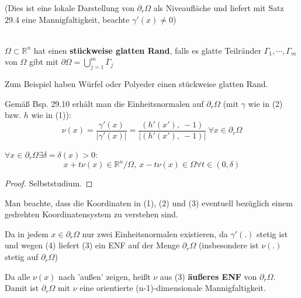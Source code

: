 (Dies ist eine lokale Darstellung von $\partial_r \Omega $ als Niveaufläche
und liefert mit Satz 29.4 eine Mannigfaltigkeit, beachte $\gamma'(x) \neq 0 $)

\begin{definition}
    \mbox{} \\
    $\Omega \subset \mathbb{R}^n $ hat einen \textbf{stückweise glatten Rand}, 
    falls es glatte Teilränder $\Gamma_1, \cdots, \Gamma_m $ von $\Omega$ gibt mit
    $\partial \Omega = \bigcup\limits_{j=1}^m \overline{\Gamma}_j $
\end{definition}

Zum Beispiel haben Würfel oder Polyeder einen stückweise glatten Rand.

Gemäß Bsp. 29.10 erhält man die Einheitsnormalen auf $\partial_r \Omega $
(mit $\gamma$ wie in (2) bzw. $h$ wie in (1)): \\

\begin{equation}
    \nu(x) = 
    \frac{\gamma'(x)}{|\gamma'(x)|} = 
    \frac{(h'(x'),\ -1)}{|(h'(x'),\ -1)|} \
    \forall x \in \partial_r \Omega
\end{equation}

\begin{lemma}
$\forall x \in \partial_r \Omega \exists \delta = \delta(x) > 0$:
\begin{equation}
    x + t \nu(x) \in \mathbb{R}^n / \Omega, \ x - t \nu(x) \in \Omega
    \forall t \in (0, \delta)
\end{equation}
\end{lemma}

\begin{proof}
    Selbststudium.
\end{proof}

Man beachte, dass die Koordinaten in (1), (2) und (3) eventuell bezüglich einem
gedrehten Koordinatensystem zu verstehen sind.

Da in jedem $x \in \partial_r \Omega $ nur zwei Einheitsnormalen existieren, da
$\gamma'(.) $ stetig ist und wegen (4) liefert (3) ein ENF auf der Menge
$\partial_r \Omega $ (insbesondere ist $\nu(.) $ stetig auf $\partial_r \Omega $)

Da alle $\nu(x) $ nach 'außen' zeigen, heißt $\nu$ aus (3) \textbf{äußeres ENF} von
$\partial_r \Omega $.\\
Damit ist $\partial_r \Omega $ mit $\nu$ eine orientierte (n-1)-dimensionale
Mannigfaltigkeit.

